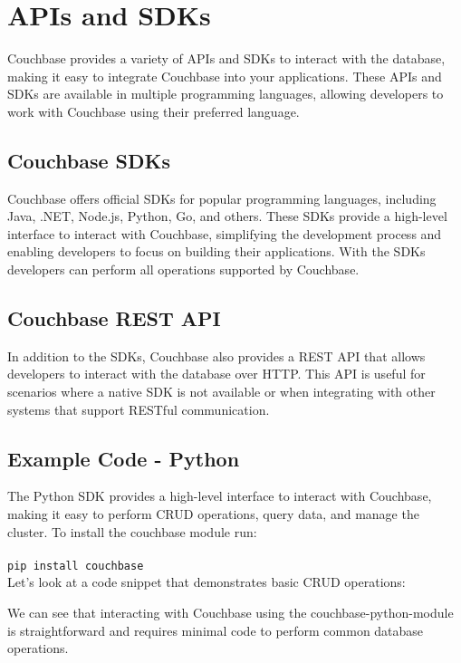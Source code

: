 \chapter{APIs and SDKs}

Couchbase provides a variety of APIs and SDKs to interact with the database, making it easy to integrate Couchbase into your applications. These APIs and SDKs are available in multiple programming languages, allowing developers to work with Couchbase using their preferred language.

\section{Couchbase SDKs}
Couchbase offers official SDKs for popular programming languages, including Java, .NET, Node.js, Python, Go, and others. These SDKs provide a high-level interface to interact with Couchbase, simplifying the development process and enabling developers to focus on building their applications. With the SDKs developers can perform all operations supported by Couchbase.
\cite{couchbaseSDKs}


\section{Couchbase REST API}
In addition to the SDKs, Couchbase also provides a REST API that allows developers to interact with the database over HTTP. This API is useful for scenarios where a native SDK is not available or when integrating with other systems that support RESTful communication.


\section{Example Code - Python}
The Python SDK provides a high-level interface to interact with Couchbase, making it easy to perform CRUD operations, query data, and manage the cluster. To install the couchbase module run:
\\
\\
\lstinline|pip install couchbase|
\cite{couchbasePythonModule}
\\

Let's look at a code snippet that demonstrates basic CRUD operations:


We can see that interacting with Couchbase using the couchbase-python-module is straightforward and requires minimal code to perform common database operations.